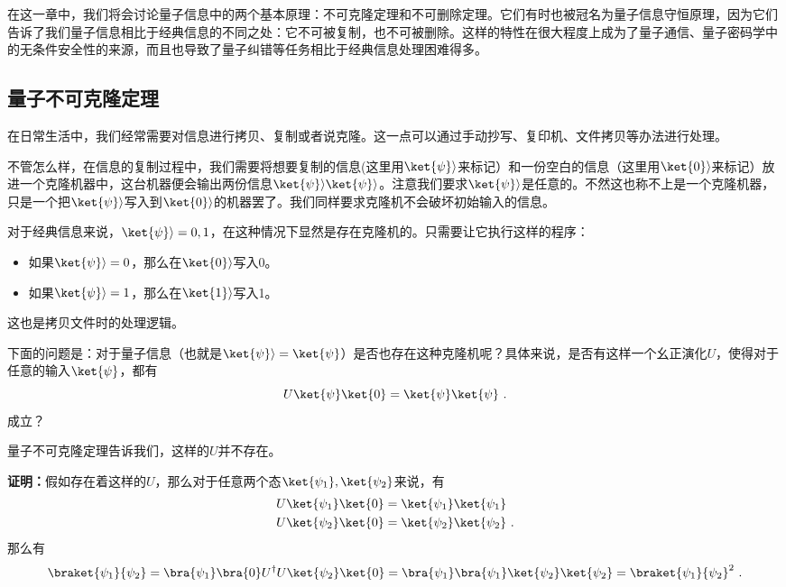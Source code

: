 
在这一章中，我们将会讨论量子信息中的两个基本原理：不可克隆定理和不可删除定理。它们有时也被冠名为量子信息守恒原理，因为它们告诉了我们量子信息相比于经典信息的不同之处：它不可被复制，也不可被删除。这样的特性在很大程度上成为了量子通信、量子密码学中的无条件安全性的来源，而且也导致了量子纠错等任务相比于经典信息处理困难得多。

\subsection{量子不可克隆定理}

在日常生活中，我们经常需要对信息进行拷贝、复制或者说克隆。这一点可以通过手动抄写、复印机、文件拷贝等办法进行处理。

不管怎么样，在信息的复制过程中，我们需要将想要复制的信息(这里用$\ket{\psi}\rangle$来标记）和一份空白的信息（这里用$\ket{0}\rangle$来标记）放进一个克隆机器中，这台机器便会输出两份信息$\ket{\psi}\rangle\ket{\psi}\rangle$。注意我们要求$\ket{\psi}\rangle$是任意的。不然这也称不上是一个克隆机器，只是一个把$\ket{\psi}\rangle$写入到$\ket{0}\rangle$的机器罢了。我们同样要求克隆机不会破坏初始输入的信息。

对于经典信息来说，$\ket{\psi}\rangle=0,1$，在这种情况下显然是存在克隆机的。只需要让它执行这样的程序：
\begin{itemize}
\item 如果$\ket{\psi}\rangle=0$，那么在$\ket{0}\rangle$写入0。
\item 如果$\ket{\psi}\rangle=1$，那么在$\ket{1}\rangle$写入1。
\end{itemize}
这也是拷贝文件时的处理逻辑。

下面的问题是：对于量子信息（也就是$\ket{\psi}\rangle=\ket{\psi}$）是否也存在这种克隆机呢？具体来说，是否有这样一个幺正演化$U$，使得对于任意的输入$\ket{\psi}$，都有
\begin{equation}
U\ket{\psi}\ket{0}=\ket{\psi}\ket{\psi}~.
\end{equation}
成立？

量子不可克隆定理告诉我们，这样的$U$并不存在。

\textbf{证明：}假如存在着这样的$U$，那么对于任意两个态$\ket{\psi_1},\ket{\psi_2}$来说，有
\begin{equation}
\begin{aligned}
U\ket{\psi_1}\ket{0}&=\ket{\psi_1}\ket{\psi_1}\\
U\ket{\psi_2}\ket{0}&=\ket{\psi_2}\ket{\psi_2}~.
\end{aligned}
\end{equation}
那么有
\begin{equation}
\braket{\psi_1}{\psi_2}=\bra{\psi_1}\bra{0}U^\dagger U\ket{\psi_2}\ket{0}=\bra{\psi_1}\bra{\psi_1}\ket{\psi_2}\ket{\psi_2}=\braket{\psi_1}{\psi_2}^2~.
\end{equation}

